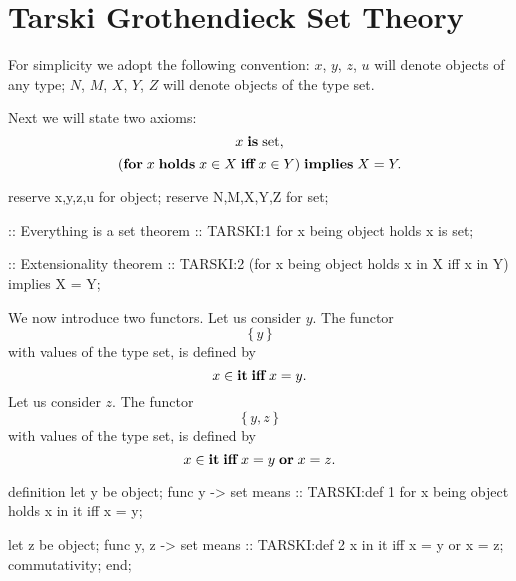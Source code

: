 \section{Tarski Grothendieck Set Theory}

\begin{paracol}{2}
For simplicity we adopt the following convention: $x$, $y$,
$z$, $u$ will denote objects of any type; $N$, $M$, $X$, $Y$, $Z$
will denote objects of the type set.
  
Next we will state two axioms:
\begin{equation}
x \mathrel{\textbf{is}} \textrm{set},
\end{equation}
\begin{equation}
(\mathrel{\textbf{for}} x\mathrel{\textbf{holds}} x\in X\mathrel{\textbf{iff}} x\in Y)\mathrel{\textbf{implies}} X=Y.
\end{equation}

\switchcolumn

\begin{mizar}
 reserve x,y,z,u for object;
 reserve N,M,X,Y,Z for set;

:: Everything is a set
theorem :: TARSKI:1
  for x being object holds x is set;

:: Extensionality
theorem :: TARSKI:2 
  (for x being object
   holds x in X iff x in Y)
  implies X = Y;
\end{mizar}

\switchcolumn*\ensurevspace{5cm}

We now introduce two functors. Let us consider $y$. The functor
\[ \{\,y\,\} \]
with values of the type set, is defined by
\[ x\in\mathop{\textbf{it}} \mathrel{\textbf{iff}} x=y.\]
Let us consider $z$. The functor
\[ \{\,y,z\,\} \]
with values of the type set, is defined by
\[ x\in\mathop{\textbf{it}} \mathrel{\textbf{iff}} x=y \mathrel{\textbf{or}} x=z.\]

\switchcolumn

\begin{mizar}
definition
  let y be object;
  func { y } -> set means
:: TARSKI:def 1
    for x being object
    holds x in it iff x = y;

  let z be object;
  func { y, z } -> set means
:: TARSKI:def 2
    x in it iff x = y or x = z;
  commutativity;
end;
\end{mizar}


\end{paracol}
